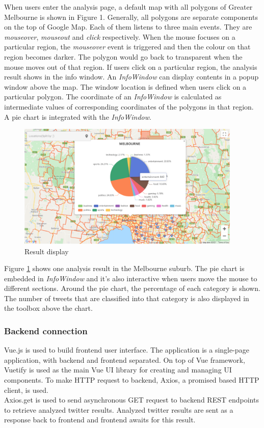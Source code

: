 \documentclass[parskip=full, 11pt]{article}
\begin{document}
When users enter the analysis page, a default map with all polygons of Greater Melbourne is shown in Figure 1. Generally, all polygons are separate components on the top of Google Map. Each of them listens to three main events. They are \emph{mouseover}, \emph{mouseout} and \emph{click} respectively. When the mouse focuses on a particular region, the \emph{mouseover} event is triggered and then the colour on that region becomes darker. The polygon would go back to transparent when the mouse moves out of that region. If users click on a particular region, the analysis result shows in the info window.
An \emph{InfoWindow} can display contents in a popup window above the map. The window location is defined when users click on a particular polygon. The coordinate of an \emph{InfoWindow} is calculated as intermediate values of corresponding coordinates of the polygons in that region. A pie chart is integrated with the \emph{InfoWindow}.
\begin{figure}[H]
    \centering
    \includegraphics[width=0.95\textwidth]{Figures/polygons.png}
    \caption{Result display}
    \label{fig:polygons}
\end{figure}
Figure \ref{fig:polygons} shows one analysis result in the Melbourne suburb. The pie chart is embedded in \emph{InfoWindow} and it’s also interactive when users move the mouse to different sections. Around the pie chart, the percentage of each category is shown. The number of tweets that are classified into that category is also displayed in the toolbox above the chart.

\subsubsection{Backend connection}

\label{sec:front_End}
Vue.js is used to build frontend user interface. The application is a single-page application, with backend and frontend separated. On top of Vue framework, Vuetify is used as the main Vue UI library for creating and managing UI components.
To make HTTP request to backend, Axios, a promised based HTTP client, is used.\\ Axios.get is used to send asynchronous GET request to backend REST endpoints to retrieve analyzed twitter results. Analyzed twitter results are sent as a response back to frontend and frontend awaits for this result. 
\end{document}
